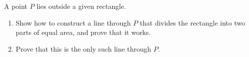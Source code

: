 A point $P$ lies outside a given rectangle.
\begin{enumerate}
\item[(a)] Show how to construct a line through $P$ that divides the rectangle into two parts of equal area, and prove that it works.
\item[(b)] Prove that this is the only such line through $P$.
\end{enumerate}
